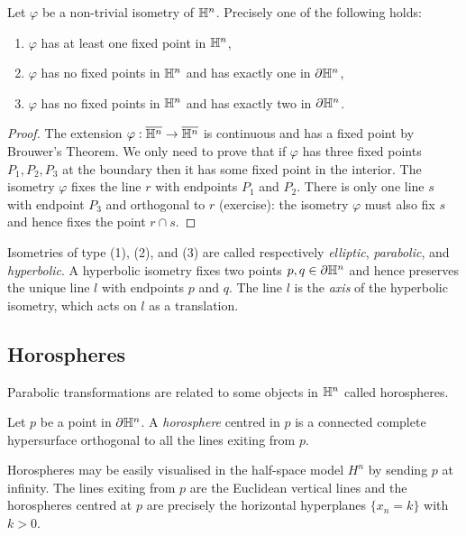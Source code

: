 \begin{prop} \label{fixed:prop}
Let $\varphi$ be a non-trivial isometry of $\mathbb{H}^n$. Precisely one of the following holds: 
\begin{enumerate}
\item $\varphi$ has at least one fixed point in $\mathbb{H}^n$, 
\item $\varphi$ has no fixed points in $\mathbb{H}^n$ and has exactly one in $\partial \mathbb{H}^n$,
\item $\varphi$ has no fixed points in $\mathbb{H}^n$ and has exactly two in $\partial \mathbb{H}^n$.
\end{enumerate}
\end{prop}
\begin{proof}
The extension $\varphi:\overline{\mathbb{H}^n} \to \overline{\mathbb{H}^n}$ is continuous and has a fixed point by Brouwer's Theorem. We only need to prove that if $\varphi$ has three fixed points $P_1, P_2, P_3$ at the boundary then it has some fixed point in the interior. The isometry $\varphi$ fixes the line $r$ with endpoints $P_1$ and $P_2$.
There is only one line $s$ with endpoint $P_3$ and orthogonal to $r$ (exercise): the isometry $\varphi$ must also fix $s$ and hence fixes the point $r\cap s$.
\end{proof}
Isometries of type (1), (2), and (3) are called respectively \emph{elliptic}, \emph{parabolic}, and \emph{hyperbolic}. A hyperbolic isometry fixes two points $p,q\in \partial \mathbb{H}^n$ and hence preserves the unique line $l$ with endpoints $p$ and $q$. The line $l$ is the \emph{axis} of the hyperbolic isometry, which acts on $l$ as a translation.

\subsection{Horospheres} \label{orosfere:subsection}
Parabolic transformations are related to some objects in $\mathbb{H}^n$ called horospheres. 

\begin{defn} Let $p$ be a point in $\partial\mathbb{H}^n$. A \emph{horosphere} centred in $p$ is a connected complete hypersurface orthogonal to all the lines exiting from $p$.
\end{defn}

Horospheres may be easily visualised in the half-space model $H^n$ by sending $p$ at infinity. The lines exiting from $p$ are the Euclidean vertical lines and the horospheres centred at $p$ are precisely the horizontal hyperplanes $\{x_n = k\}$ with $k>0$. 

